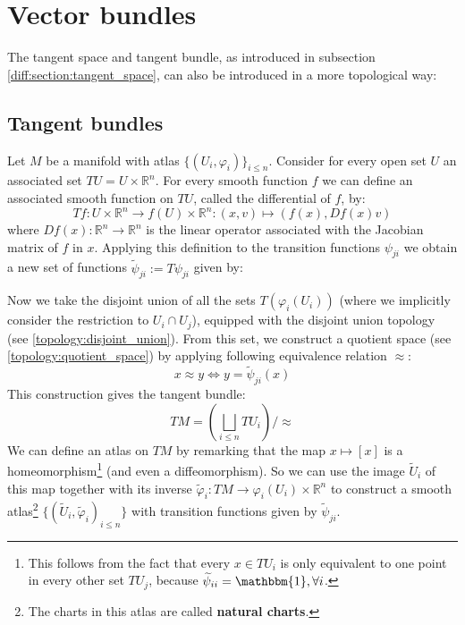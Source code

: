 
\section{Vector bundles}
	The tangent space and tangent bundle, as introduced in subsection \ref{diff:section:tangent_space}, can also be introduced in a more topological way:
	
\subsection{Tangent bundles}

	\begin{construct}
		Let $M$ be a manifold with atlas $\{(U_i, \varphi_i)\}_{i\leq n}$. Consider for every open set $U$ an associated set $TU = U\times\mathbb{R}^n$. For every smooth function $f$ we can define an associated smooth function on $TU$, called the differential of $f$, by:
		\begin{equation}
			\label{diff:manifolds:T_function}
			Tf:U\times\mathbb{R}^n\rightarrow f(U)\times\mathbb{R}^n:(x, v)\mapsto(f(x), Df(x)v)
		\end{equation}
		where $Df(x):\mathbb{R}^n\rightarrow\mathbb{R}^n$ is the linear operator associated with the Jacobian matrix of $f$ in $x$. Applying this definition to the transition functions $\psi_{ji}$ we obtain a new set of functions $\widetilde{\psi}_{ji} := T\psi_{ji}$ given by:
		
		Now we take the disjoint union of all the sets $T(\varphi_i(U_i))$ (where we implicitly consider the restriction to $U_i\cap U_j$), equipped with the disjoint union topology (see \ref{topology:disjoint_union}). From this set, we construct a quotient space (see \ref{topology:quotient_space}) by applying following equivalence relation $\approx$:
		\begin{equation}
			x\approx y\iff y = \widetilde{\psi}_{ji}(x)
		\end{equation}		
		This construction gives the tangent bundle:
		\begin{equation}
			\label{diff:manifolds:tangent_bundle_2}
			TM = \left(\bigsqcup_{i\leq n} TU_i\right)/\approx
		\end{equation}
		We can define an atlas on $TM$ by remarking that the map $x\mapsto[x]$ is a homeomorphism\footnote{This follows from the fact that every $x\in TU_i$ is only equivalent to one point in every other set $TU_j$, because $\widetilde{\psi}_{ii} = \mathbbm{1}, \forall i$.} (and even a diffeomorphism). So we can use the image $\widetilde{U}_i$ of this map together with its inverse $\widetilde{\varphi}_i:TM\rightarrow\varphi_i(U_i)\times\mathbb{R}^n$ to construct a smooth atlas\footnote{The charts in this atlas are called \textbf{natural charts}.} $\{(\widetilde{U}_i, \widetilde{\varphi}_i)_{i\leq n}\}$ with transition functions given by $\widetilde{\psi}_{ji}$.
		

\end{construct}
